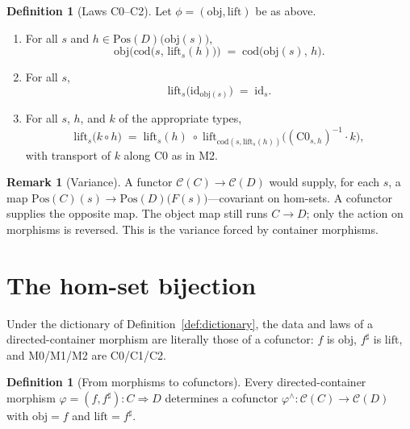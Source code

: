 \documentclass[11pt,a4paper]{article}
\theoremstyle{plain}
\theoremstyle{definition}
\newtheorem{definition}[theorem]{Definition}
\newtheorem{remark}[theorem]{Remark}
\newcommand{\Pos}{\mathrm{Pos}}
\newcommand{\id}{\mathrm{id}}
\newcommand{\cat}{\mathcal{C}}
\begin{document}
\begin{definition}[Laws C0--C2]\label{def:c-laws}
Let $\phi=(\mathrm{obj},\mathrm{lift})$ be as above.
\begin{enumerate}
  \item[\textbf{C0} (codomain).]
        For all $s$ and $h\in\Pos(D)\bigl(\mathrm{obj}(s)\bigr)$,
        \[
          \mathrm{obj}\bigl(
            \mathrm{cod}\bigl(s,\,\mathrm{lift}_s(h)\bigr)
          \bigr)
          \;=\;
          \mathrm{cod}\bigl(\mathrm{obj}(s),\,h\bigr).
        \]
  \item[\textbf{C1} (unit).]
        For all $s$,
        \[
          \mathrm{lift}_s\bigl(\id_{\mathrm{obj}(s)}\bigr)
          \;=\;
          \id_s.
        \]
  \item[\textbf{C2} (composition).]
        For all $s$, $h$, and $k$ of the appropriate types,
        \[
          \mathrm{lift}_s\bigl(k\circ h\bigr)
          \;=\;
          \mathrm{lift}_s(h)
          \;\circ\;
          \mathrm{lift}_{
            \mathrm{cod}(s,\mathrm{lift}_s(h))
          }
            \bigl((\mathrm{C0}_{s,h})^{-1}\cdot k\bigr),
        \]
        with transport of $k$ along C0 as in M2.
\end{enumerate}
\end{definition}

\begin{remark}[Variance]
A functor $\cat(C)\to\cat(D)$ would supply, for each $s$, a map
$\Pos(C)(s)\to\Pos(D)\bigl(F(s)\bigr)$---covariant on hom-sets. A cofunctor
supplies the opposite map. The object map still runs $C\to D$; only the action
on morphisms is reversed. This is the variance forced by container morphisms.
\end{remark}

\section{The hom-set bijection}

Under the dictionary of Definition~\ref{def:dictionary}, the data and laws of
a directed-container morphism are literally those of a cofunctor: $f$ is
$\mathrm{obj}$, $f^\sharp$ is $\mathrm{lift}$, and M0/M1/M2 are C0/C1/C2.

\begin{definition}[From morphisms to cofunctors]\label{def:to-cof}
Every directed-container morphism $\varphi=(f,f^\sharp):C\Rightarrow D$
determines a cofunctor $\varphi^\wedge:\cat(C)\to\cat(D)$ with
$\mathrm{obj}=f$ and $\mathrm{lift}=f^\sharp$.
\end{definition}
\end{document}
